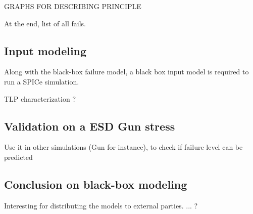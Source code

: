 GRAPHS FOR DESCRIBING PRINCIPLE

At the end, list of all fails.

\subsection{Input modeling}

Along with the black-box failure model, a black box input model is required to run a SPICe simulation.

TLP characterization ?

\subsection{Validation on a ESD Gun stress}
Use it in other simulations (Gun for instance), to check if failure level can be predicted

\subsection{Conclusion on black-box modeling}

Interesting for distributing the models to external parties.
... ?

